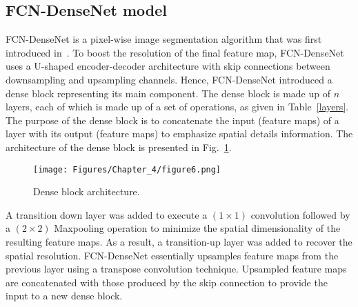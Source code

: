 \subsection{FCN-DenseNet model}
\label{sec434}
FCN-DenseNet is a pixel-wise image segmentation algorithm that was first introduced in~\cite{Jegou}.
To boost the resolution of the final feature map, FCN-DenseNet uses a U-shaped encoder-decoder architecture with skip connections between downsampling and upsampling channels.
Hence, FCN-DenseNet introduced a dense block representing its main component.
The dense block is made up of \(n\) layers, each of which is made up of a set of operations, as given in Table~\ref{layers}.
The purpose of the dense block is to concatenate the input (feature maps) of a layer with its output (feature maps) to emphasize spatial details information.
The architecture of the dense block is presented in Fig.~\ref{dense_block}. 
\begin{figure} [h!]
	\begin{center}
		\texttt{[image: Figures/Chapter\_4/figure6.png]}
	\end{center}
	\caption{Dense block architecture.} 
	\label{dense_block}
\end{figure}

A transition down layer was added to execute a \((1\times 1)\) convolution followed by a \((2\times 2)\) Maxpooling operation to minimize the spatial dimensionality of the resulting feature maps.
As a result, a transition-up layer was added to recover the spatial resolution.
FCN-DenseNet essentially upsamples feature maps from the previous layer using a transpose convolution technique.
Upsampled feature maps are concatenated with those produced by the skip connection to provide the input to a new dense block.

